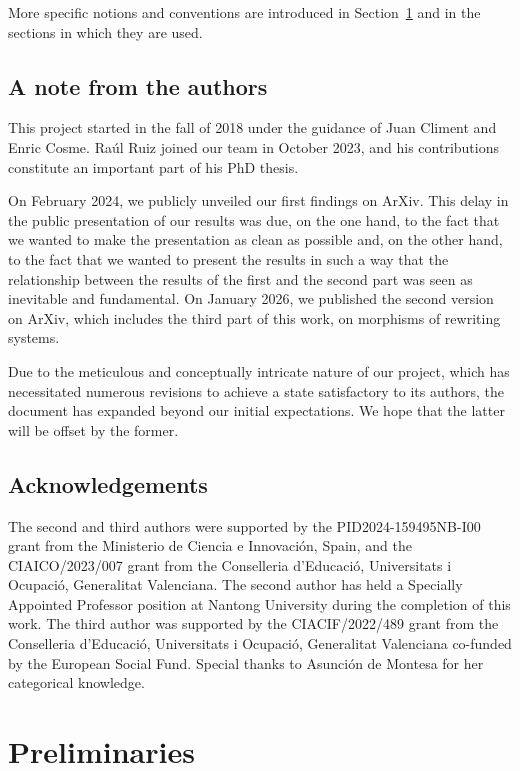 \documentclass[a4paper, reqno
]{amsart}
\theoremstyle{plain}
\theoremstyle{definition}
\begin{document}
More specific notions and conventions are introduced in Section~\ref{SPreliminaries} and in the sections in which they are used.

\subsection{A note from the authors}
This project started in the fall of 2018 under the guidance of Juan Climent and Enric Cosme.  Ra\'{u}l Ruiz joined our team in October 2023, and his contributions  constitute an important part of his PhD thesis.

On February 2024, we publicly unveiled our first findings on ArXiv.  This delay in the public presentation of our results was due, on the one hand, to the fact that we wanted to make the presentation as clean as possible and, on the other hand, to the fact that we wanted to present the results in such a way that the relationship between the results of the first and the second part was seen as inevitable and fundamental.  On January 2026, we published the second version on ArXiv, which includes the third part of this work, on morphisms of rewriting systems.

Due to the meticulous and conceptually intricate nature of our project, which has necessitated numerous revisions to achieve a state satisfactory to its authors, the document has expanded beyond our initial expectations.
We hope that the latter will be offset by the former.

\subsection{Acknowledgements}
The second and third authors were supported by the  PID2024-159495NB-I00 grant from the
Ministerio de Ciencia e Innovaci\'{o}n, Spain, and the CIAICO/2023/007 grant  from the
Conselleria d’Educaci\'{o}, Universitats i Ocupaci\'{o}, Generalitat Valenciana.
The second author has held a Specially Appointed Professor position at Nantong University during the completion of this work.
The third author was supported by the  CIACIF/2022/489 grant from the Conselleria d'Educaci\'{o}, Universitats i Ocupaci\'{o}, Generalitat Valenciana co-funded by the European Social Fund.
Special thanks to Asunci\'{o}n de Montesa for her categorical knowledge.

\section{Preliminaries}\label{SPreliminaries}
\end{document}
